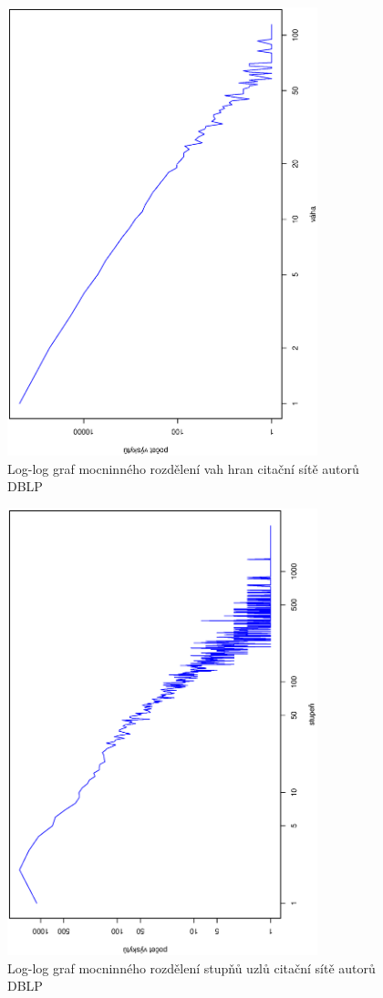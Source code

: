 \documentclass{bakalarka}
\begin{document}
\begin{figure}[!ht]
\centering
	\includegraphics[width=9cm,angle=270]{ewd_dblp.eps}
	\caption{Log-log graf mocninného rozdělení vah hran citační sítě autorů DBLP}
	\label{fig:dblpweightsdistribution}
\end{figure}
\begin{figure}[!ht]
\centering
	\includegraphics[width=9cm,angle=270]{dd_dblp.eps}
	\caption{Log-log graf mocninného rozdělení stupňů uzlů citační sítě autorů DBLP}
	\label{fig:dblpdegreedistribution}
\end{figure}
\end{document}
